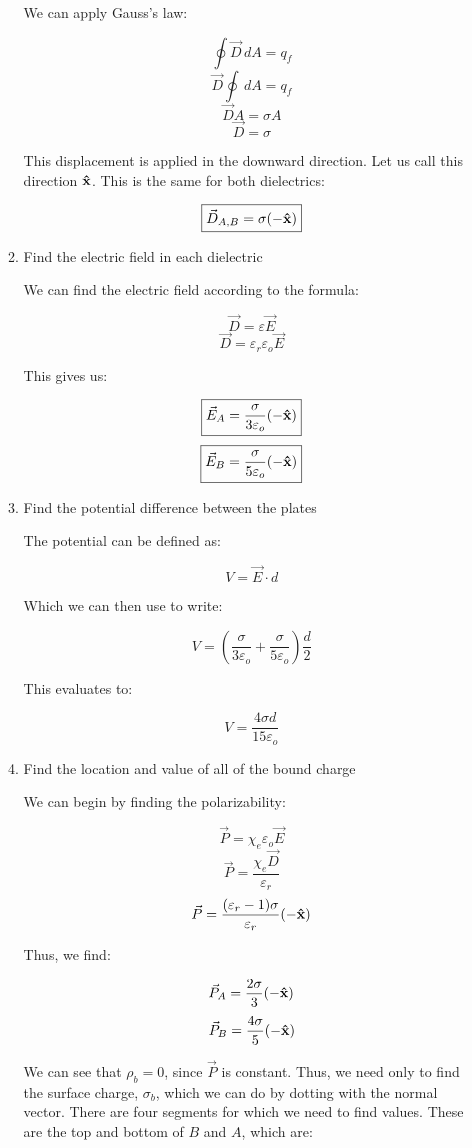 \begin{enumerate}
\begin{enumerate}
        We can apply Gauss's law:

        $$\oint\vec{D}\,dA=q_f$$
        $$\vec{D}\oint\,dA=q_f$$
        $$\vec{D}A=\sigma A$$
        $$\vec{D}=\sigma$$

        This displacement is applied in the downward direction. Let us call this direction $\bold{\hat{x}}$. This is the same for both dielectrics:

        $$\boxed{\vec{D}_{A,B}=\sigma(-\bold{\hat{x}})}$$

      \item Find the electric field  in each dielectric

        We can find the electric field according to the formula:

        $$\vec{D}=\varepsilon\vec{E}$$
        $$\vec{D}=\varepsilon_r\varepsilon_o\vec{E}$$

        This gives us:

        $$\boxed{\vec{E}_A=\frac{\sigma}{3\varepsilon_o}(-\bold{\hat{x}})}$$
        $$\boxed{\vec{E}_B=\frac{\sigma}{5\varepsilon_o}(-\bold{\hat{x}})}$$

      \item Find the potential difference between the plates

        The potential can be defined as:

        $$V=\vec{E}\cdot d$$

        Which we can then use to write:

        $$V=\left( \frac{\sigma}{3\varepsilon_o} +\frac{\sigma}{5\varepsilon_o}\right)\frac{d}{2}$$

        This evaluates to:

        $$\boxed{V=\frac{4\sigma d}{15\varepsilon_o}}$$

      \item Find the location and value of all of the bound charge

        We can begin by finding the polarizability:

        $$\vec{P}=\chi_e\varepsilon_o\vec{E}$$
        $$\vec{P}=\frac{\chi_e\vec{D}}{\varepsilon_r}$$
        $$\vec{P}=\frac{(\varepsilon_r-1)\sigma}{\varepsilon_r}(-\bold{\hat{x}})$$

        Thus, we find:

        $$\vec{P}_A=\frac{2\sigma}{3}(-\bold{\hat{x}})$$
        $$\vec{P}_B=\frac{4\sigma}{5}(-\bold{\hat{x}})$$

        We can see that $\rho_b=0$, since $\vec{P}$ is constant. Thus, we need only to find the surface charge, $\sigma_b$, which we can do by dotting with the normal vector. There are four segments for which we need to find values. These are the top and bottom of $B$ and $A$, which are:



\end{enumerate}
\end{enumerate}
